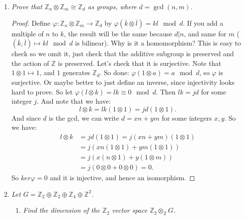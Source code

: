\documentclass[12pt]{amsbook}
\theoremstyle{plain}
\numberwithin{section}{chapter}
\numberwithin{equation}{chapter}
\theoremstyle{definition}
\theoremstyle{remark}
\newcommand{\z}{\mathbb{Z}}
\newcommand{\bb}{\vspace{3mm}}
\newcommand{\bee}{\begin{equation}\begin{aligned}}
\newcommand{\eee}{\end{aligned}\end{equation}}
\newcommand{\tens}{\otimes}
\renewcommand{\bar}{\overline}%
\renewcommand{\phi}{\varphi}
\begin{document}
\begin{enumerate}[label=\arabic*.]
\begin{enumerate}
\begin{proof}
 So for any $u$, there exists a nonzero $a$ s.t. $a\bar{u} \in RB$, so $au + c_1v_1 + \cdots c_kv_k = 0$ for some $c_i \in R,v_i \in B$. Hence $a\bar{u} = 0 \in M/RB$, and thus $M/RB$ is a torsion module. 
\end{proof}

\begin{proof}
Leibman's proof. $M/RB$ is torsion module. If $v \in M$ is such that $av \neq 0 \mod RB$ $\forall a \neq 0$, then $B \cup \Set{v}$ is linearly independent. Why? If $av + \sum a_\alpha v_\alpha = 0$ for some $a_\alpha,v_\alpha \in B$, then $a = 0$, so... Done. If $R$ has zero divisors then no element is linearly dependent, so you cannot find them, since we can divide 0. So must have $R$ is an integral domain. 
\end{proof}
\end{enumerate}
\bb

\item \textit{Prove that $\z_n \tens \z_m \cong \z_d$ as groups, where $d = \gcd(n,m)$. }

\begin{proof}
Define $\phi: \z_n \tens \z_m \to \z_d$ by $\phi(\bar{k}\tens \bar{l}) = kl \mod d$. If you add a multiple of $n$ to $k$, the result will be the same because $d|n$, and same for $m$ ($(\bar{k},\bar{l}) \mapsto kl \mod d$ is bilinear). Why is it a homomorphism? This is easy to check so we omit it, just check that the additive subgroup is preserved and the action of $\z$ is preserved.  Let's check that it is surjective. Note that $1 \tens 1 \mapsto 1$, and $1$ generates $\z_d$. So done: $\phi(1 \tens a) = a \mod d$, so $\phi$ is surjective. Or maybe better to just define an inverse, since injectivity looks hard to prove. So let $\phi(l \tens k) = lk \equiv 0 \mod d$. Then $lk = jd$ for some integer $j$. And note that we have:
$$
l \tens k = lk(1 \tens 1) = jd(1 \tens 1).
$$
And since $d$ is the gcd, we can write $d = xn + ym$ for some integers $x,y$. So we have:
\bee
l \tens k &= jd(1 \tens 1) = j(xn + ym)(1 \tens 1)\\
&= j(xn(1 \tens 1) + ym(1 \tens 1))\\
&= j(x(n \tens 1) + y(1 \tens m))\\
&= j(0 \tens 0 + 0 \tens 0) = 0.
\eee
So $ker\phi = 0$ and it is injective, and hence an isomorphism. 
\end{proof}
\bb

\item \textit{Let $G = \z_2 \oplus \z_2 \oplus \z_4 \oplus \z^2$. }
\begin{enumerate}
\item \textit{Find the dimension of the $\z_2$ vector space $\z_2 \tens_\z G$. }


\end{enumerate}
\end{enumerate}
\end{document}
